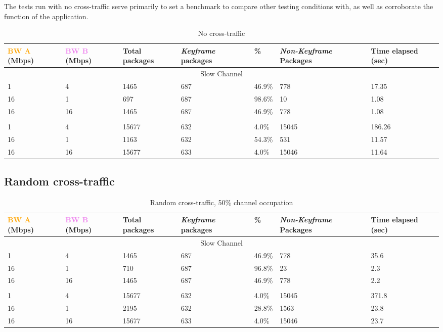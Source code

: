 The tests run with no cross-traffic serve primarily to set a benchmark to compare other testing conditions with, as well as corroborate the function of the application. 

\begin{table}[htbp]
\caption{No cross-traffic}
\break
\setlength{\arrayrulewidth}{1mm}
\setlength{\tabcolsep}{12pt}
\renewcommand{\arraystretch}{1.5}
 {
\begin{tabular}{ |p{1.375cm}|p{1.375cm}|p{1.5cm}|p{1.5cm}|p{1cm}|p{1.75cm}|p{1.75cm}| }
\hline
\textcolor{orange}{BW A} (Mbps)&\textcolor{violet}{BW B} (Mbps)& Total packages & \textit{Keyframe} packages & \% & \textit{Non-Keyframe} Packages & Time elapsed (sec) \\
\hline
\multicolumn{7}{|c|}{Slow Channel} \\
\hline
1&4&1465&687&46.9\%&778&17.35\\
16&1&697&687&98.6\%&10&1.08\\
16&16&1465&687&46.9\%&778&1.08\\
\hline
\rowcolor{white}\multicolumn{7}{|c|}{Medium Channel} \\
\hline
1&4&15677&632&4.0\%&15045&186.26\\
16&1&1163&632&54.3\%&531&11.57\\
16&16&15677&633&4.0\%&15046&11.64\\
\hline
\end{tabular}
}
\end{table}


\subsection{Random cross-traffic}

\begin{table}[htbp]
\caption{Random cross-traffic, 50\% channel occupation}
\break
\setlength{\arrayrulewidth}{1mm}
\setlength{\tabcolsep}{12pt}
\renewcommand{\arraystretch}{1.5}
 {
\begin{tabular}{ |p{1.375cm}|p{1.375cm}|p{1.5cm}|p{1.5cm}|p{1cm}|p{1.75cm}|p{1.75cm}| }
\hline
\textcolor{orange}{BW A} (Mbps)&\textcolor{violet}{BW B} (Mbps)& Total packages & \textit{Keyframe} packages & \% & \textit{Non-Keyframe} Packages & Time elapsed (sec) \\
\hline
\multicolumn{7}{|c|}{Slow Channel} \\
\hline
1&4&1465&687&46.9\%&778&35.6\\
16&1&710&687&96.8\%&23&2.3\\
16&16&1465&687&46.9\%&778&2.2\\
\hline
\rowcolor{white}\multicolumn{7}{|c|}{Medium Channel} \\
\hline
1&4&15677&632&4.0\%&15045&371.8\\
16&1&2195&632&28.8\%&1563&23.8\\
16&16&15677&633&4.0\%&15046&23.7\\
\hline
\end{tabular}
}
\end{table}

